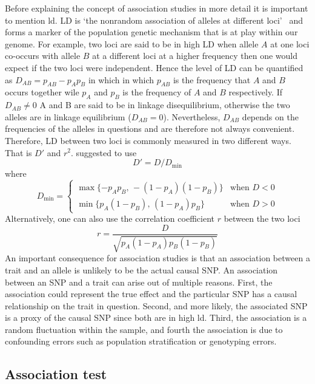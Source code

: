 Before explaining the concept of association studies in more detail it is important to mention \acrfull{ld}.
LD is `the nonrandom association of alleles at different loci'~\cite{Slatkin2008} and forms a marker of the population genetic mechanism that is at play within our genome.
For example, two loci are said to be in high LD when allele $A$ at one loci co-occurs with allele $B$ at a different loci at a higher frequency then one would expect if the two loci were independent.
Hence the level of LD can be quantified as $D_{AB}=p_{AB} - p_{A}p_{B}$ in which in which $p_{AB}$ is the frequency that $A$ and $B$ occurs together wile $p_A$ and $p_B$ is the frequency of $A$ and $B$ respectively.
If $D_{AB} \neq 0$ A and B are said to be in linkage disequilibrium, otherwise the two alleles are in linkage equilibrium ($D_{AB}=0$).
Nevertheless, $D_{AB}$ depends on the frequencies of the alleles in questions and are therefore not always convenient.
Therefore, LD between two loci is commonly measured in two different ways. 
That is $D'$ and $r^2$.
\citet{Lewontin1964} suggested to use
\begin{equation}\label{eq:dprime}
  D' = D/D_{\min}
\end{equation}
where 
\begin{equation*}
  D_{\min}= \begin{cases}
    \max\{-p_A p_B,\,-(1-p_A)(1-p_B)\} & \text{when } D < 0\\
    \min\{p_A (1-p_B),\,(1-p_A) p_B\} & \text{when } D > 0
  \end{cases} 
\end{equation*}
Alternatively, one can also use the correlation coefficient $r$ between the two loci 
\begin{equation}\label{eq:r2}
  r=\frac{D}{\sqrt{p_A(1-p_A)p_B (1-p_B)}}
\end{equation}
An important consequence for association studies is that an association between a trait and an allele is unlikely to be the actual causal SNP\@.
An association between an SNP and a trait can arise out of multiple reasons.
First, the association could represent the true effect and the particular SNP has a causal relationship on the trait in question.
Second, and more likely, the associated SNP is a proxy of the causal SNP since both are in high \acrshort{ld}.
Third, the association is a random fluctuation within the sample, and 
fourth the association is due to confounding errors such as population stratification or genotyping errors.

\subsection{Association test}
\label{sub:association_test}

